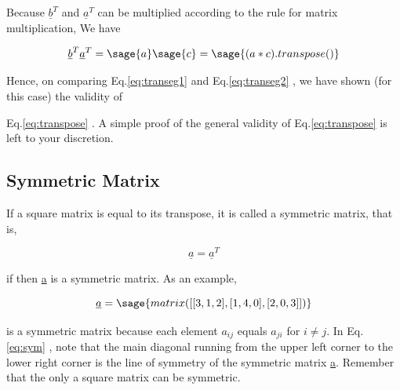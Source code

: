 \documentclass[12pt]{report}
\newcommand{\lab}[1]{
	Eq.\ref{#1}
}
\begin{document}
Because $\underline{b}^T$ and $\underline{a}^T$ can be multiplied
according to the rule for matrix multiplication, We have

\begin{equation}
	\underline{b}^T\underline{a}^T = \sage{a} \sage{c} = \sage{(a*c).transpose()}
	\label{eq:transeg2}
\end{equation}

Hence, on comparing \lab{eq:transeg1} and \lab{eq:transeg2}, 
we have shown (for this case) the validity of 
\lab{eq:transpose}. A simple proof of the general
validity of \lab{eq:transpose} is left to your discretion.


\subsection{Symmetric Matrix}

If a square matrix is equal to its transpose, it is called a symmetric
matrix, that is,

\begin{equation}
	\underline{a} = \underline{a}^T
\end{equation}

 if then \underline{a} is a symmetric matrix. As an
example,

\begin{equation}
	\underline{a}=\sage{matrix([[3,1,2],[1,4,0],[2,0,3]])}
	\label{eq:sym}
\end{equation}

is a symmetric matrix because each element $a_{{ij}}$ equals $a_{{ji}}$ for $i
\neq j$. In \lab{eq:sym}, note that the main diagonal running from the
upper left corner to the lower right corner is the line of symmetry of
the symmetric matrix \underline{a}. Remember that the only a square
matrix can be symmetric.

\end{document}
